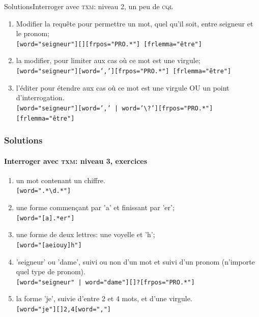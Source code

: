 \documentclass{beamer}
\begin{document}



\appendix

\begin{frame}{Solutions}{Interroger avec \textsc{txm}: niveau 2, un peu de \textsc{cql}}

\begin{enumerate}
	\item Modifier la requête pour permettre un mot, quel qu'il soit, entre seigneur et le pronom;\\
	\texttt{[word="seigneur"][][frpos="PRO.*"] [frlemma="être"]}
	\item la modifier, pour limiter aux cas où ce mot est une virgule;\\
	\texttt{[word="seigneur"][word=','][frpos="PRO.*"] [frlemma="être"] }
	\item l'éditer pour étendre aux cas où ce mot est une virgule OU un point d'interrogation.\\
	\texttt{[word="seigneur"][word=',' | word='\textbackslash?'][frpos="PRO.*"] [frlemma="être"] }
\end{enumerate}

\end{frame}

\begin{frame}[fragile]
\frametitle{Solutions}
\framesubtitle{Interroger avec \textsc{txm}: niveau 3, exercices}

\begin{enumerate}
	\item un mot contenant un chiffre.\\
	\texttt{[word=".*\textbackslash{}d.*"]}
	\item une forme commençant par 'a' et finissant par 'er';\\
	\texttt{[word="[a].*er"]}
	\item une forme de deux lettres: une voyelle et 'h';\\
	\texttt{[word="[aeiouy]h"]}
	\item 'seigneur' ou 'dame', suivi ou non d'un mot et suivi d'un pronom (n'importe quel type de pronom).\\
	\texttt{[word="seigneur" | word="dame"][]?[frpos="PRO.*"]}
	\item la forme 'je', suivie d'entre 2 et 4 mots, et d'une virgule.\\
	\texttt{[word="je"][]{2,4}[word=","]}
\end{enumerate}

\end{frame}
\end{document}
